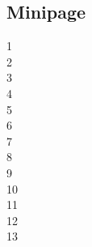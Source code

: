 \subsection{Minipage}
\begin{minipage}{0.1\linewidth}
    \flushright\color{blue}
	1 \\2 \\3 \\4 \\5 \\6 \\7 \\8 \\9 \\10 \\11 \\12 \\13 
\end{minipage}
\begin{minipage}{0.8\linewidth}
	\lipsum[1]
\end{minipage}